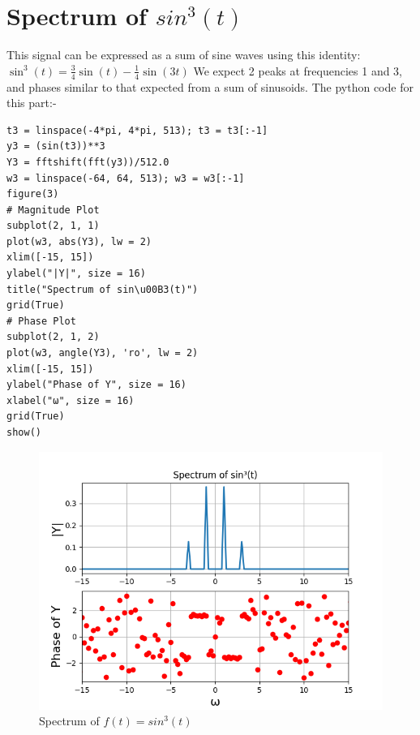 \documentclass{article}
\begin{document}
\section{Spectrum of $sin^3(t)$}
This signal can be expressed as a sum of sine waves using this identity:\newline
$\sin^3(t) = \frac{3}{4}\sin(t) - \frac{1}{4}\sin(3t)$\newline
We expect 2 peaks at frequencies 1 and 3, and phases similar to that expected from a sum of sinusoids.
The python code for this part:-
\begin{lstlisting}
t3 = linspace(-4*pi, 4*pi, 513); t3 = t3[:-1]
y3 = (sin(t3))**3
Y3 = fftshift(fft(y3))/512.0
w3 = linspace(-64, 64, 513); w3 = w3[:-1]
figure(3)
# Magnitude Plot
subplot(2, 1, 1)
plot(w3, abs(Y3), lw = 2)
xlim([-15, 15])
ylabel("|Y|", size = 16)
title("Spectrum of sin\u00B3(t)")
grid(True)
# Phase Plot
subplot(2, 1, 2)
plot(w3, angle(Y3), 'ro', lw = 2)
xlim([-15, 15])
ylabel("Phase of Y", size = 16)
xlabel("ω", size = 16)
grid(True)
show()
\end{lstlisting}
\begin{figure}[h!]
\centering
\includegraphics[scale=0.6]{Ass8_Figure_5.png}
\caption{Spectrum of $f(t) = sin^3(t)$}
\label{fig:universe}
\end{figure}
\end{document}
